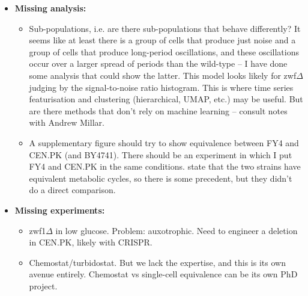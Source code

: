 \begin{itemize}
\item \textbf{Missing analysis:}
\begin{itemize}
\item Sub-populations, i.e. are there sub-populations that behave differently?  It seems like at least there is a group of cells that produce just noise and a group of cells that produce long-period oscillations, and these oscillations occur over a larger spread of periods than the wild-type -- I have done some analysis that could show the latter.  This model looks likely for zwf$\Delta$ judging by the signal-to-noise ratio histogram.  This is where time series featurisation and clustering (hierarchical, UMAP, etc.) may be useful.  But are there methods that don't rely on machine learning -- consult notes with Andrew Millar.
\item A supplementary figure should try to show equivalence between FY4 and CEN.PK (and BY4741).  There should be an experiment in which I put FY4 and CEN.PK in the same conditions. \textcite{baumgartnerFlavinbasedMetabolicCycles2018} state that the two strains have equivalent metabolic cycles, so there is some precedent, but they didn't do a direct comparison.
\end{itemize}
\item \textbf{Missing experiments:}
\begin{itemize}
\item zwf1$\Delta$ in low glucose.  Problem: auxotrophic.  Need to engineer a deletion in CEN.PK, likely with CRISPR.
\item Chemostat/turbidostat.  But we lack the expertise, and this is its own avenue entirely.  Chemostat vs single-cell equivalence can be its own PhD project.
\end{itemize}
\end{itemize}

